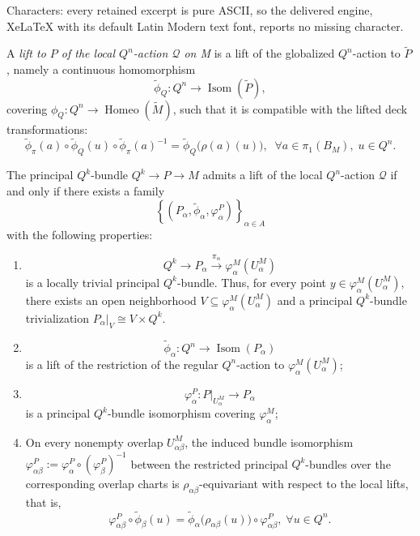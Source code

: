\documentclass[10pt,a4paper]{amsart}
\begin{document}
Characters: every retained excerpt is pure ASCII, so the delivered engine, XeLaTeX with its default Latin Modern text font, reports no missing character.
\begin{definition}
\label{def:local-Q-lifting}
A \emph{lift to $P$ of the local \(Q^n\)-action \(\mathcal Q\) on M} is a lift of the globalized \(Q^n\)-action to \(\widetilde P\), namely a continuous
homomorphism
\[
\widetilde\phi_Q:
Q^n\longrightarrow
\operatorname{Isom}(\widetilde P),
\]
covering $\phi_Q:Q^n\longrightarrow\operatorname{Homeo}(\widetilde M)$,
such that it is compatible with the lifted deck transformations:
\begin{equation}
\label{eq:lifted-semidir-compatibility}
\widetilde\phi_\pi(a)\circ
\widetilde\phi_Q(u)\circ
\widetilde\phi_\pi(a)^{-1}
=
\widetilde\phi_Q\bigl(\rho(a)(u)\bigr),\;\;\forall a\in\pi_1(B_M),\;u\in Q^n.
\end{equation}
\end{definition}

\begin{prop}
\label{prop:local-lifting-chartwise}
The principal \(Q^k\)-bundle $Q^k\longrightarrow P\longrightarrow M$ admits a lift of the local \(Q^n\)-action \(\mathcal Q\) if and only if there exists a family
\[
\left\{
(P_\alpha,\widetilde\phi_\alpha,\varphi_\alpha^P)
\right\}_{\alpha\in A}
\]
with the following properties:
\begin{enumerate}
\item[(1)]
\[
Q^k\longrightarrow
P_\alpha
\overset{\pi_\alpha}{\longrightarrow}
\varphi_\alpha^M(U_\alpha^M)
\]
is a locally trivial principal \(Q^k\)-bundle. Thus, for every point \(y\in \varphi_\alpha^M(U_\alpha^M),\) there exists an open neighborhood \(V\subseteq \varphi_\alpha^M(U_\alpha^M)\) and a principal \(Q^k\)-bundle trivialization \(P_\alpha|_V\cong V\times Q^k\).

\item[(2)]
\[
\widetilde\phi_\alpha:
Q^n\longrightarrow
\operatorname{Isom}(P_\alpha)
\]
is a lift of the restriction of the regular \(Q^n\)-action to
\(\varphi_\alpha^M(U_\alpha^M)\);

\item[(3)]
\[
\varphi_\alpha^P:
P|_{U_\alpha^M}
\longrightarrow
P_\alpha
\]
is a principal \(Q^k\)-bundle isomorphism covering
\(\varphi_\alpha^M\);

\item[(4)] On every nonempty overlap \(U_{\alpha\beta}^M\), the induced bundle isomorphism \(\varphi_{\alpha\beta}^P:=\varphi_\alpha^P\circ(\varphi_\beta^P)^{-1}\) between the restricted principal \(Q^k\)-bundles over the corresponding overlap charts is \(\rho_{\alpha\beta}\)-equivariant with respect to the local lifts, that is,
\begin{equation}
\label{eq:local-lift-overlap}
\varphi_{\alpha\beta}^P\circ
\widetilde\phi_\beta(u)
=
\widetilde\phi_\alpha\bigl(\rho_{\alpha\beta}(u)\bigr)
\circ
\varphi_{\alpha\beta}^P,\;\forall u\in Q^n.
\end{equation}
\end{enumerate}
\end{prop}
\end{document}
